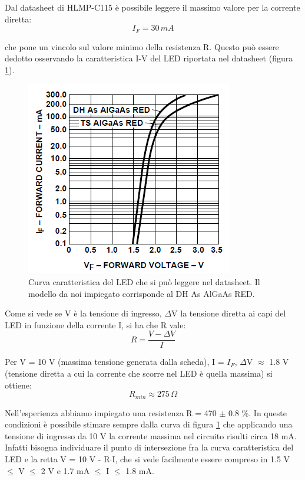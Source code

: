 \documentclass[journal, a4paper]{IEEEtran}
\begin{document}
Dal datasheet di HLMP-C115 è possibile leggere il massimo valore per la corrente diretta:
\begin{equation}
I_F = 30\, mA
\end{equation}

che pone un vincolo sul valore minimo della resistenza R. Questo può essere dedotto osservando la caratteristica I-V del LED riportata nel datasheet (figura \ref{fig:c115car}).

\begin{figure}[htp]
\centering
\includegraphics[scale=.6]{IF-VF}
\caption{Curva caratteristica del LED che si può leggere nel datasheet. Il modello da noi impiegato corrisponde al DH As AlGaAs RED.}
\label{fig:c115car}
\end{figure}

Come si vede se V è la tensione di ingresso, $\Delta$V la tensione diretta ai capi del LED in funzione della corrente I, si ha che R vale:
\begin{equation}
R = \frac{V-\Delta V}{I}
\end{equation}

Per V = 10 V (massima tensione generata dalla scheda), I = $I_F$, $\Delta$V $\approx$ 1.8 V (tensione diretta a cui la corrente che scorre nel LED è quella massima) si ottiene:
\begin{equation}
R_{min} \approx 275 \, \Omega
\end{equation}

Nell'esperienza abbiamo impiegato una resistenza R = 470 $\pm$ 0.8 $\%$. In queste condizioni è possibile stimare sempre dalla curva di figura \ref{fig:c115car} che applicando una tensione di ingresso da 10 V la corrente massima nel circuito risulti circa 18 mA. Infatti bisogna individuare il punto di intersezione fra la curva caratteristica del LED e la retta V = 10 V - R$\cdot$I, che si vede facilmente essere compreso in 1.5 V $\leq$ V $\leq$ 2 V e 1.7 mA $\leq$ I $\leq$ 1.8 mA.\\
\end{document}
